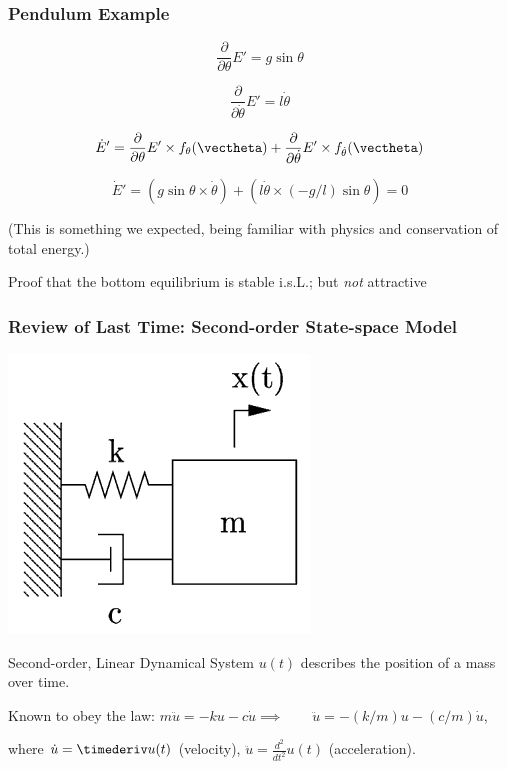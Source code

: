 \documentclass[12pt]{beamer}
\begin{document}
\begin{frame}
\frametitle{Pendulum Example}
\[
\frac{\partial}{\partial\theta} E' = g \sin \theta
\]

\[
\frac{\partial}{\partial\dot\theta} E' = l \dot\theta
\]

\[
\dot E' =
	\frac{\partial}{\partial\theta} E' 
		\times f_{\theta}(\vectheta)
	+ \frac{\partial}{\partial\dot\theta} E'
		\times f_{\dot\theta}(\vectheta)
\]


\[
\dot E' =
	\left( g \sin\theta \times \dot\theta \right)
	+ \left( l \dot\theta \times (-g/l) \sin \theta \right) = 0
\]

(This is something we expected, being familiar with physics and conservation of total energy.)

Proof that the bottom equilibrium is stable i.s.L.; but \emph{not} attractive

\end{frame}










\begin{frame}
\frametitle{Review of Last Time: Second-order State-space Model}

\begin{center}
\includegraphics[width=.3\linewidth]{pic/spring-mass-damper.png}
\end{center}

\begin{block}{Second-order, Linear Dynamical System}
$u(t)$ describes the position of a mass over time.

Known to obey the law:
$m \ddot u = -k u - c \dot u
	\implies\qquad
	\ddot u = -(k/m) u - (c/m) \dot u$,
	
where $\dot u = \timederiv u(t)$ (velocity), $\ddot u = \frac{d^2}{dt^2} u(t)$ (acceleration).
\end{block}

\end{frame}
\end{document}
